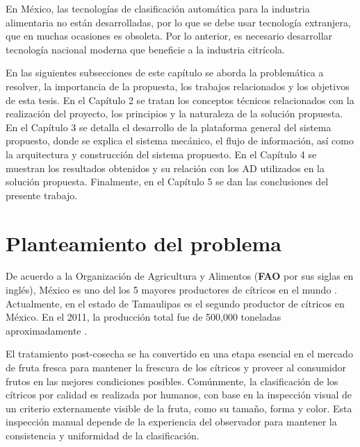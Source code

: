 \documentclass[twoside,spanish,ESP,MSc]{plantillaLabUPV}
\theoremstyle{definition}
\begin{document}
En México, las tecnologías de clasificación automática para la industria alimentaria no están desarrolladas, por lo que se debe usar tecnología extranjera, que en muchas ocasiones es obsoleta. Por lo anterior, es necesario desarrollar tecnología nacional moderna que beneficie a la industria citrícola.

En las siguientes subsecciones de este capítulo se aborda la problemática a resolver, la importancia de la propuesta, los trabajos relacionados y los objetivos de esta tesis. En el Capítulo 2 se tratan los conceptos técnicos relacionados con la realización del proyecto, los principios y la naturaleza de la solución propuesta. En el Capítulo 3 se detalla el desarrollo de la plataforma general del sistema propuesto, donde se explica el sistema mecánico, el flujo de información, así como la arquitectura y construcción  del sistema propuesto. En el Capítulo 4 se muestran los resultados obtenidos y su relación con los AD utilizados en la solución propuesta. Finalmente, en el Capítulo 5 se dan las conclusiones del presente trabajo.


\section{Planteamiento del problema}



De acuerdo a la Organización de Agricultura y Alimentos (\textbf{FAO} por sus siglas en inglés), México es uno del los 5 mayores productores de cítricos en el mundo \cite{FAO_2016}. Actualmente, en el estado de Tamaulipas es el segundo productor de cítricos en México. En el 2011, la producción total fue de 500,000 toneladas aproximadamente \cite{sag}.

El tratamiento post-cosecha se ha convertido en una etapa esencial en el mercado de fruta fresca para mantener la frescura de los cítricos y proveer al consumidor frutos en las mejores condiciones posibles. Comúnmente, la clasificación de los cítricos por calidad es realizada por humanos, con base en la inspección visual de un criterio externamente visible de la fruta, como su tamaño, forma y color. Esta inspección manual depende de la experiencia del observador para mantener la consistencia y uniformidad de la clasificación. 
\end{document}
